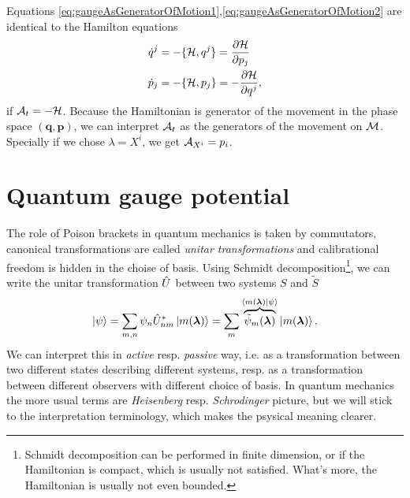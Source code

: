 Equations \ref{eq:gaugeAsGeneratorOfMotion1},\ref{eq:gaugeAsGeneratorOfMotion2} are identical to the Hamilton equations
\begin{equation}
\begin{split}
    \dot{q}^j&=-\{\mathcal{H},q^j\} = \frac{\partial \mathcal{H}}{\partial p_j}\\
    \dot{p}_j&=-\{\mathcal{H},p_j\} = -\frac{\partial \mathcal{H}}{\partial q^j},
\end{split}
\end{equation}
if $\mathcal{A}_t=-\mathcal{H}$. Because the Hamiltonian is generator of the movement in the phase space $(\bm{q},\bm{p})$, we can interpret $\mathcal{A}_t$ as the generators of the movement on $\mathcal{M}$. Specially if we chose $\lambda=X^i$, we get $\mathcal{A}_{X^i}=p_i$.




\section{Quantum gauge potential}
The role of Poison brackets in quantum mechanics is taken by commutators, canonical transformations are called \emph{unitar transformations} and calibrational freedom is hidden in the choise of basis. Using Schmidt decomposition\footnote{Schmidt decomposition can be performed in finite dimension, or if the Hamiltonian is compact, which is usually not satisfied. What's more, the Hamiltonian is usually not even bounded.}, we can write the unitar transformation $\hat{U}$ between two systems $S$ and $\tilde{S}$
\begin{equation}
    \ket{\psi} = \sum_{m,n}\psi_n \hat{U}_{nm}^*\ket{m(\bm\lambda)} = \sum_m \overbrace{\tilde{\psi}_m(\bm\lambda)}^{\braket{m(\bm\lambda)|\psi}}\ket{m(\bm\lambda)}.
\end{equation}
We can interpret this in \emph{active} resp. \emph{passive} way, i.e. as a transformation between two different states describing different systems, resp. as a transformation between different observers with different choice of basis. In quantum mechanics the more usual terms are \emph{Heisenberg} resp. \emph{Schrodinger} picture, but we will stick to the interpretation terminology, which makes the psysical meaning clearer.

